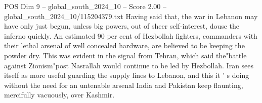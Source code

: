 \begin{textsample}{POS Dim 9 – global\_south\_2024\_10 – Score 2.00 – global\_south\_2024\_10/115204379.txt}
Having said that, the war in Lebanon may have only just begun, unless big powers, out of sheer self-interest, douse the inferno quickly.
An estimated 90 per cent of Hezbollah fighters, commanders with their lethal arsenal of well concealed hardware, are believed to be keeping the powder dry.
This was evident in the signal from Tehran, which said the"battle against Zionism"post Nasrallah would continue to be led by Hezbollah.
Iran sees itself as more useful guarding the supply lines to Lebanon, and this it ' s doing without the need for an untenable arsenal India and Pakistan keep flaunting, mercifully vacuously, over Kashmir.

\end{textsample}
